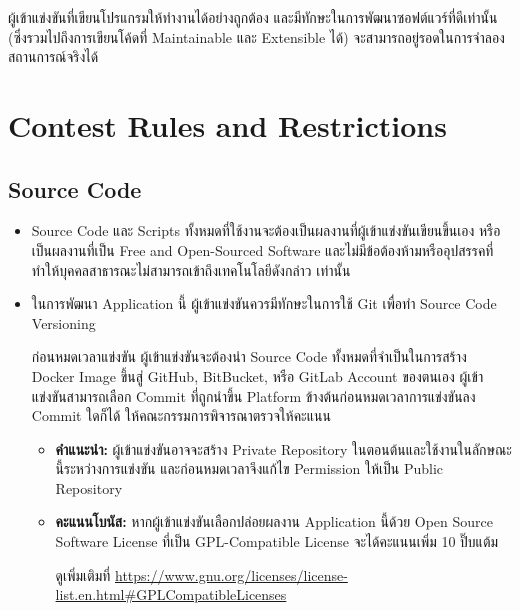 ผู้เข้าแข่งขันที่เขียนโปรแกรมให้ทำงานได้อย่างถูกต้อง และมีทักษะในการพัฒนาซอฟต์แวร์ที่ดีเท่านั้น (ซึ่งรวมไปถึงการเขียนโค้ดที่ Maintainable และ Extensible ได้) จะสามารถอยู่รอดในการจำลองสถานการณ์จริงได้

%
%


\section{Contest Rules and Restrictions}

\subsection{Source Code}

\begin{itemize}
    \item
        Source Code และ Scripts ทั้งหมดที่ใช้งานจะต้องเป็นผลงานที่ผู้เข้าแข่งขันเขียนขึ้นเอง หรือเป็นผลงานที่เป็น Free and Open-Sourced Software และไม่มีข้อต้องห้ามหรืออุปสรรคที่ทำให้บุคคลสาธารณะไม่สามารถเข้าถึงเทคโนโลยีดังกล่าว เท่านั้น
    \item
        ในการพัฒนา Application นี้ ผู้เข้าแข่งขันควรมีทักษะในการใช้ Git เพื่อทำ Source Code Versioning

        ก่อนหมดเวลาแข่งขัน ผู้เข้าแข่งขันจะต้องนำ Source Code ทั้งหมดที่จำเป็นในการสร้าง Docker Image ขึ้นสู่ GitHub, BitBucket, หรือ GitLab Account ของตนเอง \;
        ผู้เข้าแข่งขันสามารถเลือก Commit ที่ถูกนำขึ้น Platform ข้างต้นก่อนหมดเวลาการแข่งขันลง Commit ใดก็ได้ ให้คณะกรรมการพิจารณาตรวจให้คะแนน

        \begin{itemize}[topsep=0pc,itemsep=0pc]
            \item
                \textbf{คำแนะนำ:} ผู้เข้าแข่งขันอาจจะสร้าง Private Repository ในตอนต้นและใช้งานในลักษณะนี้ระหว่างการแข่งขัน และก่อนหมดเวลาจึงแก้ไข Permission ให้เป็น Public Repository
            \item
                \textbf{คะแนนโบนัส:} หากผู้เข้าแข่งขันเลือกปล่อยผลงาน Application นี้ด้วย Open Source Software License ที่เป็น {GPL-Compatible License} จะได้คะแนนเพิ่ม 10 ปิ๊บแต้ม

                {\footnotesize\vphantom{1}\llap{*\hrsp}ดูเพิ่มเติมที่ \url{https://www.gnu.org/licenses/license-list.en.html#GPLCompatibleLicenses}}
        \end{itemize}

\end{itemize}

